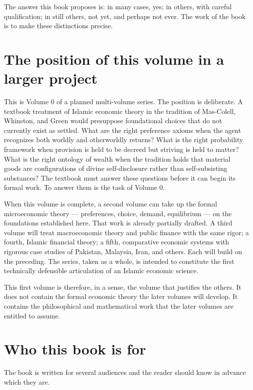 The answer this book proposes is: in many cases, yes; in others, with
careful qualification; in still others, not yet, and perhaps not ever.
The work of the book is to make these distinctions precise.

\section*{The position of this volume in a larger project}

This is Volume 0 of a planned multi-volume series. The position is
deliberate. A textbook treatment of Islamic economic theory in the
tradition of Mas-Colell, Whinston, and Green would presuppose
foundational choices that do not currently exist as settled. What are
the right preference axioms when the agent recognizes both worldly and
otherworldly returns? What is the right probability framework when
provision is held to be decreed but striving is held to matter? What is
the right ontology of wealth when the tradition holds that material
goods are configurations of divine self-disclosure rather than
self-subsisting substances? The textbook must answer these questions
before it can begin its formal work. To answer them is the task of
Volume 0.

When this volume is complete, a second volume can take up the formal
microeconomic theory --- preferences, choice, demand, equilibrium ---
on the foundations established here. That work is already partially
drafted. A third volume will treat macroeconomic theory and public
finance with the same rigor; a fourth, Islamic financial theory; a
fifth, comparative economic systems with rigorous case studies of
Pakistan, Malaysia, Iran, and others. Each will build on the
preceding. The series, taken as a whole, is intended to constitute the
first technically defensible articulation of an Islamic economic
science.

This first volume is therefore, in a sense, the volume that justifies
the others. It does not contain the formal economic theory the later
volumes will develop. It contains the philosophical and mathematical
work that the later volumes are entitled to assume.

\section*{Who this book is for}

The book is written for several audiences and the reader should know in
advance which they are.

